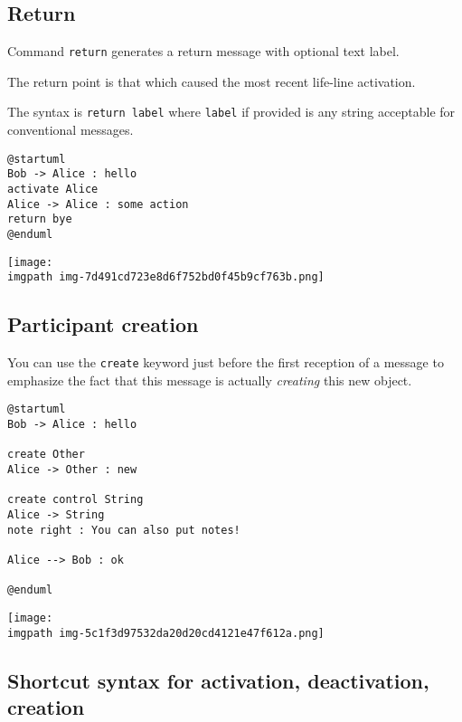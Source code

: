 \subsection{Return}


Command \texttt{return} generates a return message with optional text label.


The return point is that which caused the most recent life-line activation.


The syntax is \texttt{return label} where \texttt{label} if provided is any string acceptable for conventional messages.




\begin{verbatim}
@startuml
Bob -> Alice : hello
activate Alice
Alice -> Alice : some action
return bye
@enduml
\end{verbatim}
\begin{center}
\texttt{[image: \\imgpath img-7d491cd723e8d6f752bd0f45b9cf763b.png]}
\end{center}


%
%
\subsection{Participant creation}




You can use the \texttt{create} keyword just before the first
reception of a message to emphasize the fact that this message is
actually \textit{creating} this new object.
\begin{verbatim}
@startuml
Bob -> Alice : hello

create Other
Alice -> Other : new

create control String
Alice -> String
note right : You can also put notes!

Alice --> Bob : ok

@enduml
\end{verbatim}
\begin{center}
\texttt{[image: \\imgpath img-5c1f3d97532da20d20cd4121e47f612a.png]}
\end{center}


%
%
\subsection{Shortcut syntax for activation, deactivation, creation}




